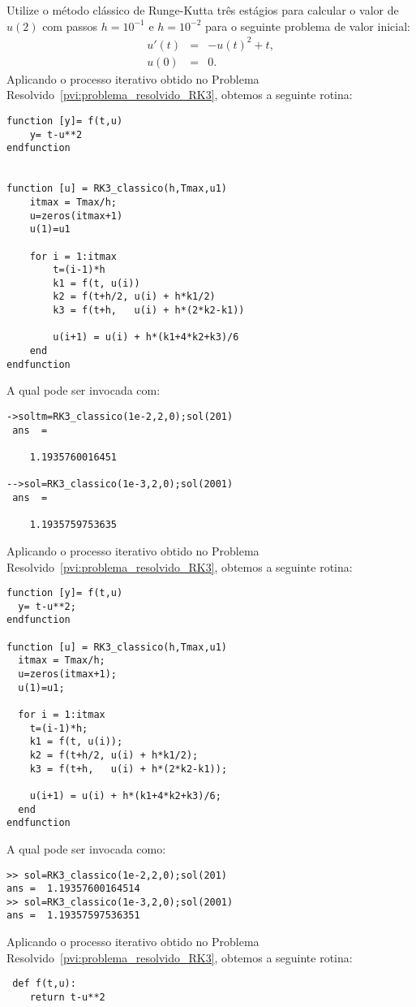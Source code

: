 \begin{exeresol} Utilize o método clássico de Runge-Kutta três estágios para calcular o valor de $u(2)$ com passos $h=10^{-1}$ e $h=10^{-2}$ para o seguinte problema de valor inicial:
\begin{eqnarray*}
 u'(t)&=& -u(t)^2 + t,\\
 u(0) &=&0.
\end{eqnarray*}
\ifisscilab
Aplicando o processo iterativo obtido no Problema Resolvido~\ref{pvi:problema_resolvido_RK3}, obtemos a seguinte rotina:
\begin{verbatim}
function [y]= f(t,u)
    y= t-u**2
endfunction


function [u] = RK3_classico(h,Tmax,u1)
    itmax = Tmax/h;
    u=zeros(itmax+1)
    u(1)=u1

    for i = 1:itmax
        t=(i-1)*h
        k1 = f(t, u(i))
        k2 = f(t+h/2, u(i) + h*k1/2)
        k3 = f(t+h,   u(i) + h*(2*k2-k1))

        u(i+1) = u(i) + h*(k1+4*k2+k3)/6
    end
endfunction
 \end{verbatim}
A qual pode ser invocada com:
\begin{verbatim}
->soltm=RK3_classico(1e-2,2,0);sol(201)
 ans  =
 
    1.1935760016451  
 
-->sol=RK3_classico(1e-3,2,0);sol(2001)
 ans  =
 
    1.1935759753635 
\end{verbatim}

 
\fi
\ifisoctave
Aplicando o processo iterativo obtido no Problema Resolvido~\ref{pvi:problema_resolvido_RK3}, obtemos a seguinte rotina:
\begin{verbatim}
function [y]= f(t,u)
  y= t-u**2;
endfunction

function [u] = RK3_classico(h,Tmax,u1)
  itmax = Tmax/h;
  u=zeros(itmax+1);
  u(1)=u1;

  for i = 1:itmax
    t=(i-1)*h;
    k1 = f(t, u(i));
    k2 = f(t+h/2, u(i) + h*k1/2);
    k3 = f(t+h,   u(i) + h*(2*k2-k1));

    u(i+1) = u(i) + h*(k1+4*k2+k3)/6;
  end
endfunction
 \end{verbatim}
A qual pode ser invocada como:
\begin{verbatim}
>> sol=RK3_classico(1e-2,2,0);sol(201)
ans =  1.19357600164514
>> sol=RK3_classico(1e-3,2,0);sol(2001)
ans =  1.19357597536351 
\end{verbatim}
\fi

\ifispython
Aplicando o processo iterativo obtido no Problema Resolvido~\ref{pvi:problema_resolvido_RK3}, obtemos a seguinte rotina:
\begin{verbatim}
 def f(t,u):
	return t-u**2



\end{verbatim}
\end{exeresol}
